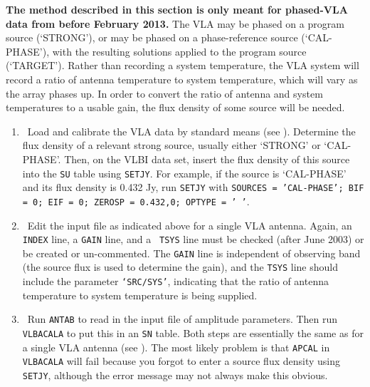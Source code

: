 
{\bf The method described in this section is only meant
for phased-VLA data from before February 2013.}
The VLA may be phased on a program source (`STRONG'), or may be phased on a
phase-reference source (`CAL-PHASE'), with the resulting solutions
applied to the program source (`TARGET').  Rather than recording a
system temperature, the VLA system will record a ratio of antenna
temperature to system temperature, which will vary as the array phases
up.  In order to convert the ratio of antenna and system temperatures
to a  usable gain, the flux density of some source will be needed.

\begin{enumerate}

\item\ {Load and calibrate the VLA data by standard means (see
).  Determine the flux density of a relevant strong source,
usually either `STRONG' or `CAL-PHASE'\@.  Then, on the VLBI data set,
insert the flux density of this source into the {\tt SU} table using
{\tt SETJY}\@.  For example, if the source is `CAL-PHASE' and its flux
density is 0.432 Jy, run {\tt SETJY} with {\tt SOURCES = 'CAL-PHASE';
BIF = 0; EIF = 0; ZEROSP = 0.432,0; OPTYPE = '\ '}\@.}

\item\ {Edit the input file as indicated above for a single VLA
antenna.  Again, an {\tt INDEX} line, a {\tt GAIN} line, and a {\tt
TSYS} line must be checked (after June 2003) or be created or
un-commented.  The {\tt GAIN} line is independent of observing band
(the source flux is used to determine the gain), and the {\tt TSYS}
line should include the parameter {\tt `SRC/SYS'}, indicating that the
ratio of antenna temperature to system temperature is being supplied.}

\item\ {Run {\tt ANTAB} to read in the input file of amplitude
 parameters.  Then run {\tt VLBACALA} to put this in
an {\tt SN} table.  Both steps are essentially the same as for a
single VLA antenna (see ).  The most likely problem is
that {\tt APCAL} in {\tt VLBACALA} will fail because you forgot to
enter a source flux density using {\tt SETJY}, although the error
message may not always make this obvious.}


\end{enumerate}
